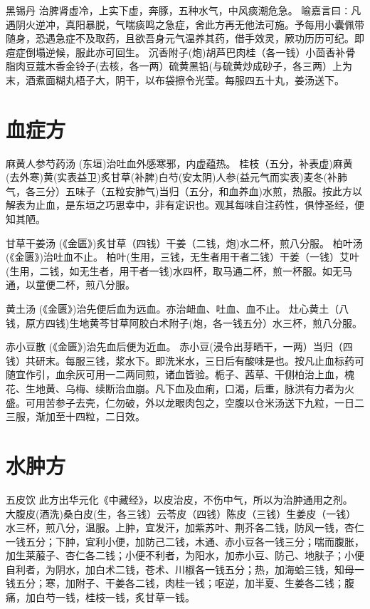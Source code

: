 \documentclass[a4paper,12pt,UTF8,twoside]{ctexbook}
\begin{document}
	黑锡丹
	治脾肾虚冷，上实下虚，奔豚，五种水气，中风痰潮危急。
	喻嘉言曰∶凡遇阴火逆冲，真阳暴脱，气喘痰鸣之急症，舍此方再无他法可施。予每用小囊佩带随身，恐遇急症不及取药，且欲吾身元气温养其药，借手效灵，厥功历历可纪。即痘症倒塌逆候，服此亦可回生。
	沉香附子(炮)胡芦巴肉桂（各一钱）小茴香补骨脂肉豆蔻木香金铃子(去核，各一两）硫黄黑铅(与硫黄炒成砂子，各三两）上为末，酒煮面糊丸梧子大，阴干，以布袋擦令光莹。每服四五十丸，姜汤送下。
	
	\section{血症方}
	 麻黄人参芍药汤
	(东垣)治吐血外感寒邪，内虚蕴热。
	桂枝（五分，补表虚)麻黄(去外寒)黄(实表益卫)炙甘草(补脾)白芍(安太阴)人参(益元气而实表)麦冬(补肺气，各三分）五味子（五粒安肺气)当归（五分，和血养血)水煎，热服。按此方以解表为止血，是东垣之巧思幸中，非有定识也。观其每味自注药性，俱悖圣经，便知其陋。
	
	甘草干姜汤
	(《金匮》)炙甘草（四钱）干姜（二钱，炮)水二杯，煎八分服。
	柏叶汤(《金匮》)治吐血不止。
	柏叶(生用，三钱，无生者用干者二钱）干姜（一钱）艾叶(生用，二钱，如无生者，用干者一钱)水四杯，取马通二杯，煎一杯服。如无马通，以童便二杯，煎八分服。
	
	黄土汤
	(《金匮》)治先便后血为远血。亦治衄血、吐血、血不止。
	灶心黄土（八钱，原方四钱)生地黄芩甘草阿胶白术附子(炮，各一钱五分）水三杯，煎八分服。
	
	赤小豆散
	(《金匮》)治先血后便为近血。
	赤小豆(浸令出芽晒干，一两）当归（四钱）共研末。每服三钱，浆水下。即洗米水，三日后有酸味是也。按凡止血标药可随宜作引，血余灰可用一二两同煎，诸血皆验。栀子、茜草、干侧柏治上血，槐花、生地黄、乌梅、续断治血崩。凡下血及血痢，口渴，后重，脉洪有力者为火盛。可用苦参子去壳，仁勿破，外以龙眼肉包之，空腹以仓米汤送下九粒，一日二三服，渐加至十四粒，二日效。
	
	
	
	\section{水肿方}
		
	五皮饮
	此方出华元化《中藏经》，以皮治皮，不伤中气，所以为治肿通用之剂。
	大腹皮(酒洗)桑白皮(生，各三钱）云苓皮（四钱）陈皮（三钱）生姜皮（一钱）水三杯，煎八分，温服。上肿，宜发汗，加紫苏叶、荆芥各二钱，防风一钱，杏仁一钱五分；下肿，宜利小便，加防己二钱，木通、赤小豆各一钱三分；喘而腹胀，加生莱菔子、杏仁各二钱；小便不利者，为阳水，加赤小豆、防己、地肤子；小便自利者，为阴水，加白术二钱，苍术、川椒各一钱五分；热，加海蛤三钱，知母一钱五分；寒，加附子、干姜各二钱，肉桂一钱；呕逆，加半夏、生姜各二钱；腹痛，加白芍一钱，桂枝一钱，炙甘草一钱。
	
\end{document}
